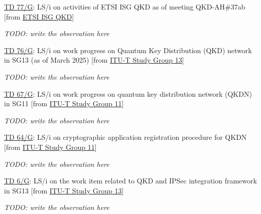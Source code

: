\href{https://www.itu.int/md/meetingdoc.asp?lang=en\&parent=T25-SG17-250408-TD-GEN-0077}{TD 77/G}: LS/i on activities of ETSI ISG QKD as of meeting QKD-AH\#37ab  [from \href{https://www.itu.int/md/meetingdoc.asp?lang=en\&parent=T25-SG17-250408-TD-GEN\&question=Q15/17\&source=ETSI\%20ISG\%20QKD}{ETSI ISG QKD}]

\textit{TODO: write the observation here}

\href{https://www.itu.int/md/meetingdoc.asp?lang=en\&parent=T25-SG17-250408-TD-GEN-0076}{TD 76/G}: LS/i on work progress on Quantum Key Distribution (QKD) network in SG13 (as of March 2025)  [from \href{https://www.itu.int/md/meetingdoc.asp?lang=en\&parent=T25-SG17-250408-TD-GEN\&question=Q15/17\&source=ITU-T\%20Study\%20Group\%2013}{ITU-T Study Group 13}]

\textit{TODO: write the observation here}

\href{https://www.itu.int/md/meetingdoc.asp?lang=en\&parent=T25-SG17-250408-TD-GEN-0067}{TD 67/G}: LS/i on work progress on quantum key distribution network (QKDN) in SG11  [from \href{https://www.itu.int/md/meetingdoc.asp?lang=en\&parent=T25-SG17-250408-TD-GEN\&question=Q15/17\&source=ITU-T\%20Study\%20Group\%2011}{ITU-T Study Group 11}]

\textit{TODO: write the observation here}

\href{https://www.itu.int/md/meetingdoc.asp?lang=en\&parent=T25-SG17-250408-TD-GEN-0064}{TD 64/G}: LS/i on cryptographic application registration procedure for QKDN  [from \href{https://www.itu.int/md/meetingdoc.asp?lang=en\&parent=T25-SG17-250408-TD-GEN\&question=Q15/17\&source=ITU-T\%20Study\%20Group\%2011}{ITU-T Study Group 11}]

\textit{TODO: write the observation here}

\href{https://www.itu.int/md/meetingdoc.asp?lang=en\&parent=T25-SG17-250408-TD-GEN-0006}{TD 6/G}: LS/i on the work item related to QKD and IPSec integration framework in SG13  [from \href{https://www.itu.int/md/meetingdoc.asp?lang=en\&parent=T25-SG17-250408-TD-GEN\&question=Q15/17\&source=ITU-T\%20Study\%20Group\%2013}{ITU-T Study Group 13}]

\textit{TODO: write the observation here}
